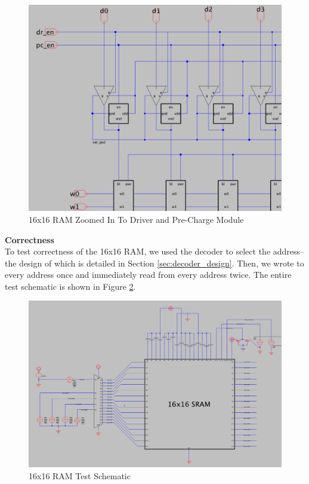 \documentclass[a4paper]{article}
\begin{document}
\begin{figure}[H]
	\centering
	\includegraphics[scale=0.3]{memory16x16SchematicDriver}
	\caption{16x16 RAM Zoomed In To Driver and Pre-Charge Module}
	\label{fig:memory16x16SchematicDriver}
\end{figure}

\textbf{Correctness}\\
To test correctness of the 16x16 RAM, we used the decoder to select the address--the design of which is detailed in Section \ref{sec:decoder_design}. Then, we wrote to every address once and immediately read from every address twice. The entire test schematic is shown in Figure \ref{fig:memory16x16TestSchematic}.

\begin{figure}[H]
	\centering
	\includegraphics[scale=0.3]{memory16x16TestSchematic}
	\caption{16x16 RAM Test Schematic}
	\label{fig:memory16x16TestSchematic}
\end{figure}
\end{document}
